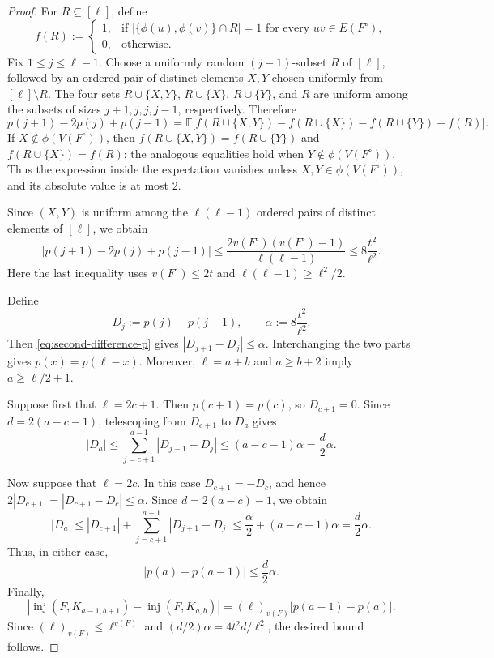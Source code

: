 \documentclass[11pt]{article}
\numberwithin{equation}{section}
\theoremstyle{definition}
\theoremstyle{remark}
\newcommand{\inj}{\operatorname{inj}}
\newcommand{\E}{\mathbb E}
\begin{document}
\begin{proof}
For $R\subseteq[\ell]$, define
\[
f(R):=
\begin{cases}
1, & \text{if }|\{\phi(u),\phi(v)\}\cap R|=1
     \text{ for every }uv\in E(F^\circ),\\
0, & \text{otherwise}.
\end{cases}
\]
Fix $1\le j\le\ell-1$. Choose a uniformly random $(j-1)$-subset $R$ of $[\ell]$, followed by an ordered pair of distinct elements $X,Y$ chosen uniformly from $[\ell]\setminus R$. The four sets $R\cup\{X,Y\}$, $R\cup\{X\}$, $R\cup\{Y\}$, and $R$ are uniform among the subsets of sizes $j+1,j,j,j-1$, respectively. Therefore
\[
p(j+1)-2p(j)+p(j-1)
=\E\bigl[f(R\cup\{X,Y\})-f(R\cup\{X\})-f(R\cup\{Y\})+f(R)\bigr].
\]
If $X\notin\phi(V(F^\circ))$, then $f(R\cup\{X,Y\})=f(R\cup\{Y\})$ and $f(R\cup\{X\})=f(R)$; the analogous equalities hold when $Y\notin\phi(V(F^\circ))$. Thus the expression inside the expectation vanishes unless $X,Y\in\phi(V(F^\circ))$, and its absolute value is at most $2$.

Since $(X,Y)$ is uniform among the $\ell(\ell-1)$ ordered pairs of distinct elements of $[\ell]$, we obtain
\begin{equation}
\label{eq:second-difference-p}
|p(j+1)-2p(j)+p(j-1)|
\le \frac{2v(F^\circ)(v(F^\circ)-1)}{\ell(\ell-1)}
\le 8\frac{t^2}{\ell^2}.
\end{equation}
Here the last inequality uses $v(F^\circ)\le2t$ and $\ell(\ell-1)\ge\ell^2/2$.

Define
\[
D_j:=p(j)-p(j-1),
\qquad
\alpha:=8\frac{t^2}{\ell^2}.
\]
Then \eqref{eq:second-difference-p} gives $|D_{j+1}-D_j|\le\alpha$. Interchanging the two parts gives $p(x)=p(\ell-x)$. Moreover, $\ell=a+b$ and $a\ge b+2$ imply $a\ge\ell/2+1$.

Suppose first that $\ell=2c+1$. Then $p(c+1)=p(c)$, so $D_{c+1}=0$. Since $d=2(a-c-1)$, telescoping from $D_{c+1}$ to $D_a$ gives
\[
|D_a|
\le\sum_{j=c+1}^{a-1}|D_{j+1}-D_j|
\le(a-c-1)\alpha
=\frac d2\alpha.
\]

Now suppose that $\ell=2c$. In this case $D_{c+1}=-D_c$, and hence $2|D_{c+1}|=|D_{c+1}-D_c|\le\alpha$. Since $d=2(a-c)-1$, we obtain
\[
|D_a|
\le |D_{c+1}|+\sum_{j=c+1}^{a-1}|D_{j+1}-D_j|
\le\frac{\alpha}{2}+(a-c-1)\alpha
=\frac d2\alpha.
\]
Thus, in either case,
\[
|p(a)-p(a-1)|\le \frac{d}{2}\alpha.
\]
Finally,
\[
\left|\inj(F,K_{a-1,b+1})-\inj(F,K_{a,b})\right|
=(\ell)_{v(F)}|p(a-1)-p(a)|.
\]
Since $(\ell)_{v(F)}\le\ell^{v(F)}$ and $(d/2)\alpha=4t^2d/\ell^2$, the desired bound follows.
\end{proof}
\end{document}
